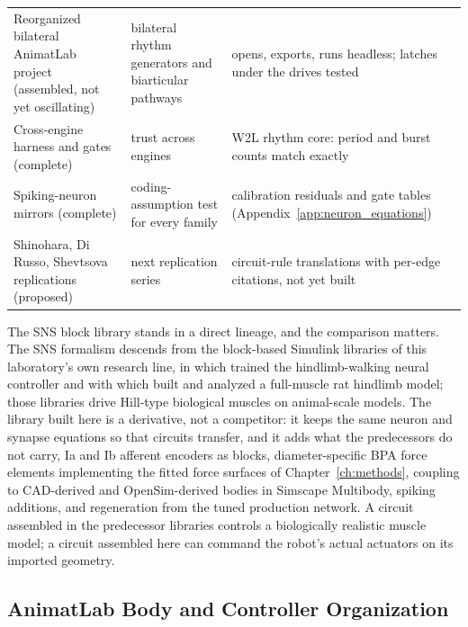 \begin{table}[htbp]
\begin{tabularx}{\textwidth}{@{}>{\raggedright\arraybackslash}p{}>{\raggedright\arraybackslash}p{}>{\raggedright\arraybackslash}X@{}}
Reorganized bilateral AnimatLab project (assembled, not yet oscillating) & bilateral rhythm generators and biarticular pathways & opens, exports, runs headless; latches under the drives tested \\
Cross-engine harness and gates (complete) & trust across engines & W2L rhythm core: period and burst counts match exactly \\
Spiking-neuron mirrors (complete) & coding-assumption test for every family & calibration residuals and gate tables (Appendix~\ref{app:neuron_equations}) \\
Shinohara, Di Russo, Shevtsova replications (proposed) & next replication series & circuit-rule translations with per-edge citations, not yet built \\
\bottomrule
\end{tabularx}
\end{table}

The SNS block library stands in a direct lineage, and the comparison matters. The SNS formalism descends from the block-based Simulink libraries of this laboratory's own research line, in which \citet{hunt_development_2017} trained the hindlimb-walking neural controller and with which \citet{young_analyzing_2019} built and analyzed a full-muscle rat hindlimb model; those libraries drive Hill-type biological muscles on animal-scale models. The library built here is a derivative, not a competitor: it keeps the same neuron and synapse equations so that circuits transfer, and it adds what the predecessors do not carry, Ia and Ib afferent encoders as blocks, diameter-specific BPA force elements implementing the fitted force surfaces of Chapter~\ref{ch:methods}, coupling to CAD-derived and OpenSim-derived bodies in Simscape Multibody, spiking additions, and regeneration from the tuned production network. A circuit assembled in the predecessor libraries controls a biologically realistic muscle model; a circuit assembled here can command the robot's actual actuators on its imported geometry.

\subsection{AnimatLab Body and Controller Organization}

